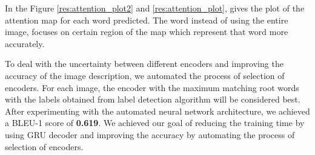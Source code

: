 \noindent In the Figure \ref{res:attention_plot2} and \ref{res:attention_plot}, gives the plot of the attention map for each word predicted. The word instead of using the entire image, focuses on certain region of the map which represent that word more accurately.

\noindent To deal with the uncertainty between different encoders and improving the accuracy of the image description, we automated the process
of selection of encoders. For each image, the encoder with
the maximum matching root words with the labels obtained
from label detection algorithm will be considered best. After
experimenting with the automated neural network architecture,
we achieved a BLEU-1 score of \textbf{0.619}. We achieved our goal
of reducing the training time by using GRU decoder and
improving the accuracy by automating the process of selection
of encoders.

